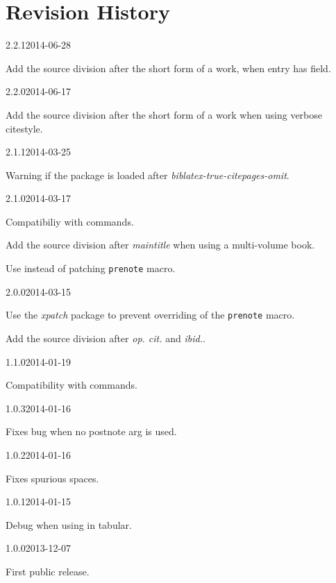 \documentclass{ltxdockit}[2011/03/25]
\begin{document}
\section{Revision History}
\begin{changelog}

\begin{release}{2.2.1}{2014-06-28}
\item Add the source division after the short form of a work, when entry has  field.
\end{release}

\begin{release}{2.2.0}{2014-06-17}
\item Add the source division after the short form of a work when using verbose citestyle.
\end{release}

\begin{release}{2.1.1}{2014-03-25}
\item Warning if the package is loaded after \emph{bibla­tex-true-citepages-omit}.
\end{release}

\begin{release}{2.1.0}{2014-03-17}
\item Compatibiliy with  commands.
\item Add the source division after \emph{maintitle} when using a multi-volume book.
\item Use  instead of patching \verb+prenote+ macro.
\end{release}


\begin{release}{2.0.0}{2014-03-15}
\item Use the \emph{xpatch} package to prevent overriding of the  \verb+prenote+ macro.
\item Add the source division after \emph{op. cit.} and \emph{ibid.}.
\end{release}


\begin{release}{1.1.0}{2014-01-19}
\item Compatibility with  commands.
\end{release}

\begin{release}{1.0.3}{2014-01-16}
\item Fixes bug when no postnote arg is used.
\end{release}

\begin{release}{1.0.2}{2014-01-16}
\item Fixes spurious spaces.
\end{release}

\begin{release}{1.0.1}{2014-01-15}
\item Debug when using in tabular.
\end{release}


\begin{release}{1.0.0}{2013-12-07}
\item First public release.
\end{release}

\end{changelog}
\end{document}
